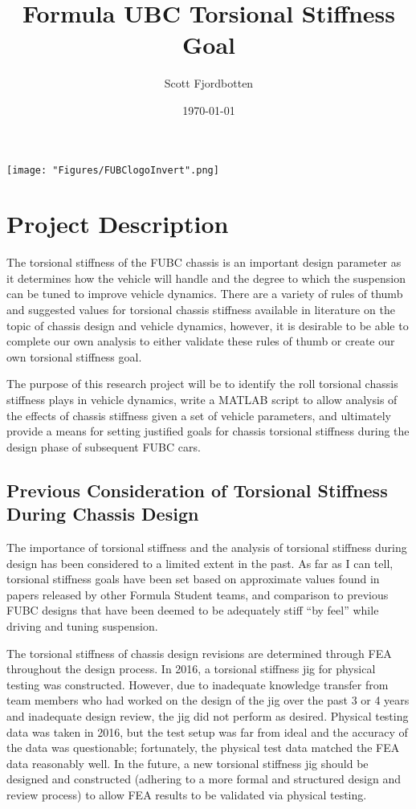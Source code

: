\documentclass[a4paper]{article}
\title{Formula UBC Torsional Stiffness Goal}
\author{Scott Fjordbotten}
\date{\today}
\numberwithin{equation}{section}
\begin{document}
	\maketitle 
	\begin{figure*}[h]
		\texttt{[image: "Figures/FUBClogoInvert".png]}
	\end{figure*}

	\newpage
	\tableofcontents
	\listoffigures
	\listoftables

\newpage
	
\section{Project Description} \label{Project Description}
The torsional stiffness of the FUBC chassis is an important design parameter as it determines how the vehicle will handle and the degree to which the suspension can be tuned to improve vehicle dynamics. There are a variety of rules of thumb and suggested values for torsional chassis stiffness available in literature on the topic of chassis design and vehicle dynamics, however, it is desirable to be able to complete our own analysis to either validate these rules of thumb or create our own torsional stiffness goal.

The purpose of this research project will be to identify the roll torsional chassis stiffness plays in vehicle dynamics, write a MATLAB script to allow analysis of the effects of chassis stiffness given a set of vehicle parameters, and ultimately provide a means for setting justified goals for chassis torsional stiffness during the design phase of subsequent FUBC cars.

\subsection{Previous Consideration of Torsional Stiffness During Chassis Design} \label{Previous Consideration of Torsional Stiffness During Chassis Design}
The importance of torsional stiffness and the analysis of torsional stiffness during design has been considered to a limited extent in the past. As far as I can tell, torsional stiffness goals have been set based on approximate values found in papers released by other Formula Student teams, and comparison to previous FUBC designs that have been deemed to be adequately stiff “by feel” while driving and tuning suspension.

The torsional stiffness of chassis design revisions are determined through FEA throughout the design process. In 2016, a torsional stiffness jig for physical testing was constructed. However, due to inadequate knowledge transfer from team members who had worked on the design of the jig over the past 3 or 4 years and inadequate design review, the jig did not perform as desired. Physical testing data was taken in 2016, but the test setup was far from ideal and the accuracy of the data was questionable; fortunately, the physical test data matched the FEA data reasonably well. In the future, a new torsional stiffness jig should be designed and constructed (adhering to a more formal and structured design and review process) to allow FEA results to be validated via physical testing.
\end{document}
